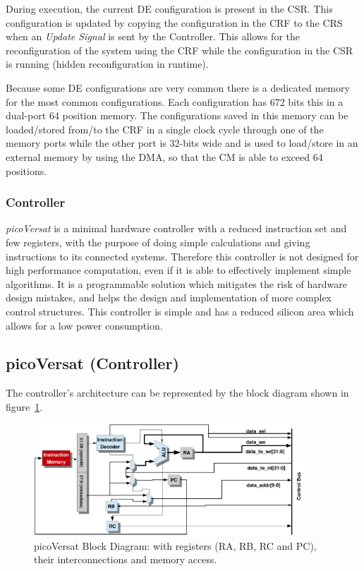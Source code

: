 During execution, the current {\sc DE} configuration is present in the {\sc
  CSR}. This configuration is updated by copying the configuration in the {\sc
  CRF} to the {\sc CRS} when an {\it Update Signal} is sent by the
Controller. This allows for the reconfiguration of the system using the {\sc
  CRF} while the configuration in the {\sc CSR} is running (hidden
reconfiguration in runtime).

Because some {\sc DE} configurations are very common there is a dedicated memory
for the most common configurations. Each configuration has 672 bits this
in a dual-port 64 position memory. The configurations saved in this memory can
be loaded/stored from/to the {\sc CRF} in a single clock cycle through one of
the memory ports while the other port is 32-bits wide and is used to load/store
in an external memory by using the {\sc DMA}, so that the {\sc CM} is able to
exceed 64 positions.

\subsubsection{Controller} %
\label{section:picoversat}

{\it picoVersat} is a minimal hardware controller with a reduced instruction set
and few registers, with the purpose of doing simple calculations and giving
instructions to its connected systems. Therefore this controller is not designed
for high performance computation, even if it is able to effectively implement
simple algorithms.  It is a programmable solution which mitigates the risk of
hardware design mistakes, and helps the design and implementation of more
complex control structures.  This controller is simple and has a reduced silicon
area which allows for a low power consumption.

\subsection{picoVersat (Controller)}
The controller's architecture can be represented by the block diagram shown in
figure~\ref{fig:bd}.

\begin{figure}[!htbp]
    \centerline{\includegraphics[width=0.9\textwidth]{Figures/bd.pdf}}
		\vspace{0cm}\caption{picoVersat Block Diagram: with registers
		(RA, RB, RC and PC), their interconnections and memory access.}
    \label{fig:bd}
\end{figure}

